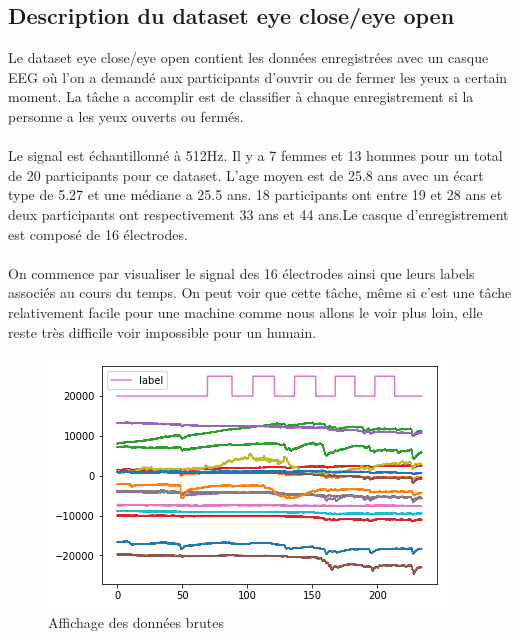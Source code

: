 \documentclass{article}[12pt]
\begin{document}
\subsection{Description du dataset eye close/eye open}
Le dataset eye close/eye open contient les données enregistrées avec un casque EEG où l'on a demandé aux participants d'ouvrir ou de fermer les yeux a certain moment. La tâche a accomplir est de classifier à chaque enregistrement si la personne a les yeux ouverts ou fermés.\\
\\
Le signal est échantillonné à 512Hz. Il y a 7 femmes et 13 hommes pour un total de 20 participants pour ce dataset. L'age moyen est de 25.8 ans avec un écart type de 5.27 et une médiane a 25.5 ans. 18 participants ont entre 19 et 28 ans et deux participants ont respectivement 33 ans et 44 ans.Le casque d'enregistrement est composé de 16 électrodes.\\
\\
On commence par visualiser le signal des 16 électrodes ainsi que leurs labels associés au cours du temps. On peut voir que cette tâche, même si c'est une tâche relativement facile pour une machine comme nous allons le voir plus loin, elle reste très difficile voir impossible pour un humain.\\
\begin{figure}[H]
\begin{center}
\includegraphics[scale=0.8]{images/donnees_entree.png}
\end{center}
\caption{Affichage des données brutes}
\end{figure}
\end{document}
